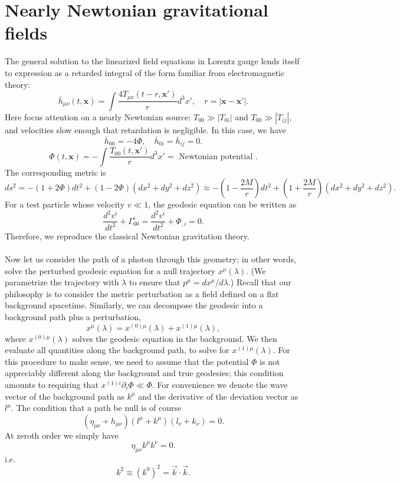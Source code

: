 \section{Nearly Newtonian gravitational fields}
The general solution to the linearized field equations in Lorentz gauge lends itself to expression as a retarded integral of the form familiar from electromagnetic theory:
\[\overline{h}_{\mu\nu}(t,\bm{x}) = \int \frac{4T_{\mu\nu}(t-r,\bm{x}')}{r} d^3x' , \quad r = |\bm{x}-\bm{x}'|.\]
Here focus attention on a nearly Newtonian source: $T_{00} \gg |T_{0i}|$ and $T_{00} \gg |T_{ij}|$, and velocities
slow enough that retardation is negligible. In this case, we have
\[\overline{h}_{00} = -4\Phi , \quad \overline{h}_{0i} = \overline{h}_{ij} = 0.\]
\[\Phi(t,\bm{x}) = -\int \frac{T_{00}(t,\bm{x}')}{r} d^3x' = \mbox{ Newtonian potential }.\]
The corresponding metric is
\[ds^2 = -(1+2\Phi)dt^2 + (1-2\Phi)(dx^2 + dy^2 + dz^2) \approx -(1-\frac{2M}{r})dt^2 + (1+\frac{2M}{r})(dx^2 + dy^2 + dz^2).\]
For a test particle whose velocity $v \ll 1$, the geodesic equation can be written as
\[\frac{d^2 v^i}{dt^2} + \Gamma^{i}_{00} = \frac{d^2 v^i}{dt^2} + \Phi_{,i} = 0.\]
Therefore, we reproduce the classical Newtonian gravitation theory.
\\ \\
Now let us consider the path of a photon through
this geometry; in other words, solve the perturbed geodesic equation for a null trajectory $x^{\mu}(\lambda)$. (We parametrize the trajectory with $\lambda$ to ensure that $p^{\mu} = dx^{\mu}/d\lambda$.)
Recall that our philosophy is to consider the metric perturbation as a field defined on a flat background spacetime. 
Similarly, we can decompose the geodesic into a background path plus a perturbation,
\[x^{\mu}(\lambda) = x^{(0)\mu}(\lambda) + x^{(1)\mu}(\lambda),\]
where $x^{(0)\mu}(\lambda)$ solves the geodesic equation in the background. 
We then evaluate all quantities along the background path, to solve for $x^{(1)\mu}(\lambda)$. 
For this procedure to make sense, we need to assume that the potential $\Phi$ is not appreciably different along the background and true geodesies;
this condition amounts to requiring that $x^{(1)i}\partial_{i}\Phi \ll \Phi$. 
For convenience we denote the wave vector of the background path as $k^{\mu}$ and the derivative of the deviation vector as $l^{\mu}$. The condition that a path be null is of course
\[(\eta_{\mu\nu} + h_{\mu\nu})(l^{\mu}+k^{\mu})(l_{\nu} + k_{\nu}) = 0.\]
At zeroth order we simply have
\[\eta_{\mu\nu} k^{\mu} k^{\nu} = 0.\]
i.e.
\[k^2 \equiv (k^0)^2 = \vec{k}\cdot\vec{k}.\]
